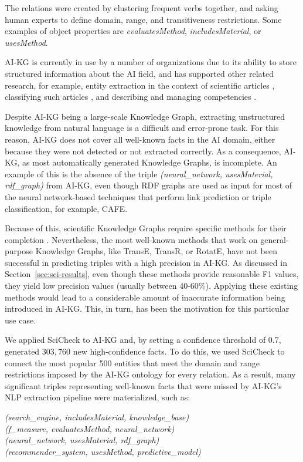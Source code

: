 The relations were created by clustering frequent verbs together, and asking human experts to define domain, range, and transitiveness restrictions. Some examples of object properties are \textit{evaluatesMethod}, \textit{includesMaterial}, or \textit{usesMethod}.

AI-KG is currently in use by a number of organizations due to its ability to store structured information about the AI field, and has supported other related research, for example, entity extraction in the context of scientific articles \cite{li2021}, classifying such articles \cite{hoppe2021}, and describing and managing competencies \cite{heist2021}.

Despite AI-KG being a large-scale Knowledge Graph, extracting unstructured knowledge from natural language is a difficult and error-prone task. For this reason, AI-KG does not cover all well-known facts in the AI domain, either because they were not detected or not extracted correctly. As a consequence, AI-KG, as most automatically generated Knowledge Graphs, is incomplete. An example of this is the absence of the triple \textit{(neural\_network, usesMaterial, rdf\_graph)} from AI-KG, even though RDF graphs are used as input for most of the neural network-based techniques that perform link prediction or triple classification, for example, CAFE.

Because of this, scientific Knowledge Graphs require specific methods for their completion \cite{jaradeh2021}. Nevertheless, the most well-known methods that work on general-purpose Knowledge Graphs, like TransE, TransR, or RotatE, have not been successful in predicting triples with a high precision in AI-KG. As discussed in Section~\ref{sec:sci-results}, even though these methods provide reasonable F1 values, they yield low precision values (usually between 40-60\%). Applying these existing methods would lead to a considerable amount of inaccurate information being introduced in AI-KG. This, in turn, has been the motivation for this particular use case.

We applied SciCheck to AI-KG and, by setting a confidence threshold of $0.7$, generated $303,760$ new high-confidence facts. To do this, we used SciCheck to connect the most popular 500 entities that meet the domain and range restrictions imposed by the AI-KG ontology for every relation. As a result, many significant triples representing well-known facts that were missed by AI-KG's NLP extraction pipeline were materialized, such as:

\begin{center}
    \textit{(search\_engine, includesMaterial, knowledge\_base)}\\
    \textit{(f\_measure, evaluatesMethod, neural\_network)}\\
    \textit{(neural\_network, usesMaterial, rdf\_graph)}\\
    \textit{(recommender\_system, usesMethod, predictive\_model)}
\end{center}

